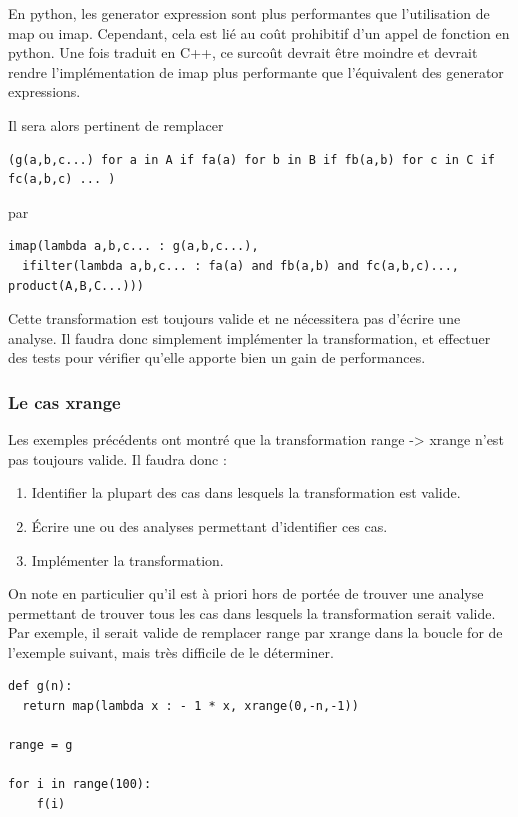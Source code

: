 \documentclass[a4paper]{article}
\begin{document}
En python, les generator expression sont plus performantes que
l'utilisation de map ou imap. Cependant, cela est lié au coût
prohibitif d'un appel de fonction en python. Une fois traduit en C++,
ce surcoût devrait être moindre et devrait rendre l'implémentation de
imap plus performante que l'équivalent des generator expressions.

Il sera alors pertinent de remplacer

\begin{verbatim}
(g(a,b,c...) for a in A if fa(a) for b in B if fb(a,b) for c in C if fc(a,b,c) ... )
\end{verbatim}
 
par

\begin{verbatim}
imap(lambda a,b,c... : g(a,b,c...), 
  ifilter(lambda a,b,c... : fa(a) and fb(a,b) and fc(a,b,c)..., product(A,B,C...)))
\end{verbatim}

Cette transformation est toujours valide et ne nécessitera pas
d'écrire une analyse. Il faudra donc simplement implémenter la
transformation, et effectuer des tests pour vérifier qu'elle apporte
bien un gain de performances.

\subsubsection{Le cas xrange}

Les exemples précédents ont montré que la transformation range ->
xrange n'est pas toujours valide. Il faudra donc :

\begin{enumerate}
\item Identifier la plupart des cas dans lesquels la transformation
  est valide.
\item Écrire une ou des analyses permettant d'identifier ces cas.
\item Implémenter la transformation.
\end{enumerate}

On note en particulier qu'il est à priori hors de portée de trouver
une analyse permettant de trouver tous les cas dans lesquels la
transformation serait valide. Par exemple, il serait valide de
remplacer range par xrange dans la boucle for de l'exemple suivant,
mais très difficile de le déterminer.


\begin{verbatim}
def g(n):
  return map(lambda x : - 1 * x, xrange(0,-n,-1))

range = g

for i in range(100):
    f(i)
\end{verbatim}
\end{document}
